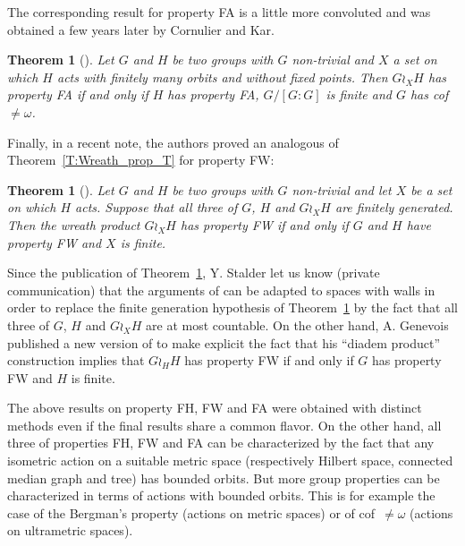 \documentclass[a4paper]{article}
\newtheorem{thm}[lem]{Theorem}
\theoremstyle{definition}
\begin{document}
The corresponding result for property FA is a little more convoluted and was obtained a few years later by Cornulier and Kar.
%
%
\begin{thm}[\cite{Cornulier2011}]\label{Thm:FACK}
Let $G$ and $H$ be two groups with $G$ non-trivial and $X$ a set on which $H$ acts with finitely many orbits and without fixed points.
Then $G\wr_XH$ has property FA if and only if $H$ has property FA, $G/[G:G]$ is finite and $G$ has cof~$\neq\omega$.
\end{thm}
%
%
Finally, in a recent note, the authors proved an analogous of Theorem~\ref{T:Wreath_prop_T} for property FW:
%
%
\begin{thm}[\cite{LS2020}]\label{Thm:PropFW}
Let $G$ and $H$ be two groups with $G$ non-trivial and let $X$ be a set on which $H$ acts. Suppose that all three of $G$, $H$ and $G\wr_XH$ are finitely generated. Then the wreath product $G \wr_X H$ has property FW if and only if $G$ and $H$ have property FW and $X$ is finite.
\end{thm}
%
%
Since the publication of Theorem~\ref{Thm:PropFW}, Y. Stalder let us know (private communication) that the arguments of \cite{LS2020} can be adapted to spaces with walls in order to replace the finite generation hypothesis of Theorem~\ref{Thm:PropFW} by the fact that all three of $G$, $H$ and $G\wr_XH$ are at most countable.
On the other hand, A. Genevois published a new version of \cite{2017arXiv170500834G} to make explicit the fact that his ``diadem product'' construction implies that $G\wr_HH$ has property FW if and only if $G$ has property FW and $H$ is finite.

The above results on property FH, FW and FA were obtained with distinct methods even if the final results share a common flavor.
On the other hand, all three of properties FH, FW and FA can be characterized by the fact that any isometric action on a suitable metric space (respectively Hilbert space, connected median graph and tree) has bounded orbits.
But more group properties can be characterized in terms of actions with bounded orbits. This is for example the case of the Bergman's property (actions on metric spaces) or of cof~$\neq\omega$ (actions on ultrametric spaces).
\end{document}
